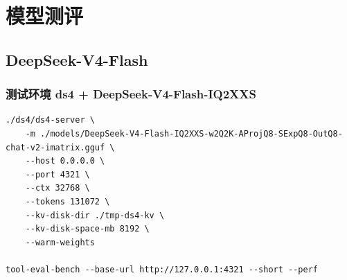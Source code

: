 \documentclass{article}
\begin{document}
\section{模型测评}
\subsection{DeepSeek-V4-Flash}
\subsubsection{测试环境 ds4 + DeepSeek-V4-Flash-IQ2XXS}
\begin{lstlisting}
./ds4/ds4-server \
    -m ./models/DeepSeek-V4-Flash-IQ2XXS-w2Q2K-AProjQ8-SExpQ8-OutQ8-chat-v2-imatrix.gguf \
    --host 0.0.0.0 \
    --port 4321 \
    --ctx 32768 \
    --tokens 131072 \
    --kv-disk-dir ./tmp-ds4-kv \
    --kv-disk-space-mb 8192 \
    --warm-weights

tool-eval-bench --base-url http://127.0.0.1:4321 --short --perf
\end{lstlisting}
\end{document}
